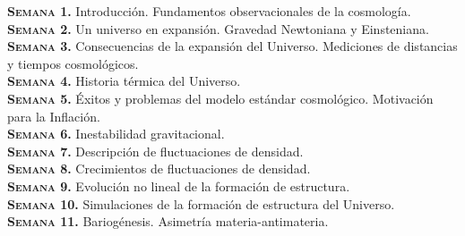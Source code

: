 \documentclass[letterpaper,10pt,onecolumn]{article}
\begin{document}























\noindent\normalsize\textbf{\textsc{Semana 1.}}
Introducci\'on. Fundamentos observacionales de la cosmolog\'ia. 
\\[-0.3cm]

\noindent\textbf{\textsc{Semana 2.}} 
Un universo en expansi\'on. Gravedad Newtoniana y Einsteniana.
\\[-0.3cm]  

\noindent\textbf{\textsc{Semana 3.}} 
Consecuencias de la expansi\'on del Universo. Mediciones de distancias
y tiempos cosmol\'ogicos.
\\[-0.3cm]  

\noindent\textbf{\textsc{Semana 4.}} 
Historia t\'ermica del Universo.
\\[-0.3cm]  

\noindent\textbf{\textsc{Semana 5.}}
\'Exitos y problemas del modelo est\'andar cosmol\'ogico. Motivaci\'on
para la Inflaci\'on.
\\[-0.3cm]

\noindent\textbf{\textsc{Semana 6.}} 
Inestabilidad gravitacional.
\\[-0.3cm]  

\noindent\textbf{\textsc{Semana 7.}} 
Descripci\'on de fluctuaciones de densidad. 
\\[-0.3cm] 

\noindent\textbf{\textsc{Semana 8.}} 
Crecimientos de fluctuaciones de densidad. 
\\[-0.3cm]  

\noindent\textbf{\textsc{Semana 9.}} 
Evoluci\'on no lineal de la formaci\'on de estructura. 
\\[-0.3cm] 

\noindent\textbf{\textsc{Semana 10.}}  
Simulaciones de la formaci\'on de estructura del Universo.
\\[-0.3cm] 

\noindent\textbf{\textsc{Semana 11.}}  
Bariogénesis. Asimetría materia-antimateria.
\\[-0.3cm] 
\end{document}
